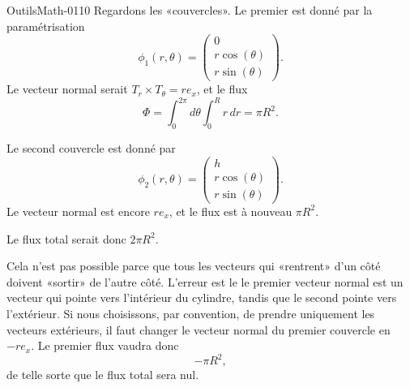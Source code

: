 \begin{corrige}{OutilsMath-0110}
    Regardons les «couvercles». Le premier est donné par la paramétrisation
    \begin{equation}
        \phi_1(r,\theta)=\begin{pmatrix}
            0    \\ 
            r\cos(\theta)    \\ 
            r\sin(\theta)    
        \end{pmatrix}.
    \end{equation}
    Le vecteur normal serait $T_r\times T_{\theta}=re_x$, et le flux
    \begin{equation}
        \Phi=\int_0^{2\pi}d\theta\int_0^Rr\,dr=\pi R^2.
    \end{equation}
    
    Le second couvercle est donné par
    \begin{equation}
        \phi_2(r,\theta)=\begin{pmatrix}
            h    \\ 
            r\cos(\theta)    \\ 
            r\sin(\theta)    
        \end{pmatrix}.
    \end{equation}
    Le vecteur normal est encore $re_x$, et le flux est à nouveau $\pi R^2$.

    Le flux total serait donc $2\pi R^2$.

    Cela n'est pas possible parce que tous les vecteurs qui «rentrent» d'un côté doivent «sortir» de l'autre côté. L'erreur est le le premier vecteur normal est un vecteur qui pointe vers l'intérieur du cylindre, tandis que le second pointe vers l'extérieur. Si nous choisissons, par convention, de prendre uniquement les vecteurs extérieurs, il faut changer le vecteur normal du premier couvercle en $-re_x$. Le premier flux vaudra donc
    \begin{equation}
        -\pi R^2,
    \end{equation}
    de telle sorte que le flux total sera nul.

\end{corrige}
